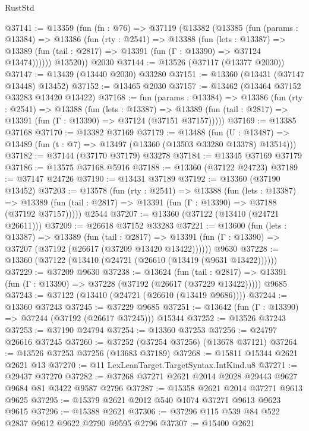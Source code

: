 \begin{lexlean}{RustStd}
\begin{coremodule}
@37141 := @13359
    (fun (fn : @76) =>
    @37119
      (@13382
        (@13385
          (fun (params : @13384) =>
          @13386
            (fun (rty : @2541) =>
            @13388
              (fun (lets : @13387) =>
              @13389 (fun (tail : @2817) => @13391 (fun (Γ : @13390) => @37124 @13474))))))
        @13520))
    @2030
@37144 := @13526 (@37117 (@13377 @2030))
@37147 := @13439 (@13440 @2030) @33280
@37151 := @13360 (@13431 (@37147 @13448) @13452)
@37152 := @13465 @2030
@37157 := @13462 (@13464 @37152 @33283 @13420 @13422)
@37168 := fun (params : @13384) =>
  @13386
    (fun (rty : @2541) =>
    @13388
      (fun (lets : @13387) =>
      @13389 (fun (tail : @2817) => @13391 (fun (Γ : @13390) => @37124 (@37151 @37157)))))
@37169 := @13385 @37168
@37170 := @13382 @37169
@37179 := @13488
    (fun (U : @13487) => @13489 (fun (t : @7) => @13497 (@13360 (@13503 @33280 @13378) @13514)))
@37182 := @37144 (@37170 @37179) @33278
@37184 := @13345 @37169 @37179
@37186 := @13575 @37168 @5916
@37188 := @13360 (@37122 @24723)
@37189 := @37147 @24726
@37190 := @13431 @37189
@37192 := @13360 (@37190 @13452)
@37203 := @13578
    (fun (rty : @2541) =>
    @13388
      (fun (lets : @13387) =>
      @13389 (fun (tail : @2817) => @13391 (fun (Γ : @13390) => @37188 (@37192 @37157)))))
    @2544
@37207 := @13360 (@37122 (@13410 (@24721 @26611)))
@37209 := @26618 @37152 @33283
@37221 := @13600
    (fun (lets : @13387) =>
    @13389
      (fun (tail : @2817) =>
      @13391 (fun (Γ : @13390) => @37207 (@37192 (@26617 (@37209 @13420 @13422))))))
    @9630
@37228 := @13360 (@37122 (@13410 (@24721 (@26610 (@13419 (@9631 @13422))))))
@37229 := @37209 @9630
@37238 := @13624
    (fun (tail : @2817) => @13391 (fun (Γ : @13390) => @37228 (@37192 (@26617 (@37229 @13422)))))
    @9685
@37243 := @37122 (@13410 (@24721 (@26610 (@13419 @9686))))
@37244 := @13360 @37243
@37245 := @37229 @9685
@37251 := @13642 (fun (Γ : @13390) => @37244 (@37192 (@26617 @37245))) @15344
@37252 := @13526 @37243
@37253 := @37190 @24794
@37254 := @13360 @37253
@37256 := @24797 @26616 @37245
@37260 := @37252 (@37254 @37256) (@13678 @37121)
@37264 := @13526 @37253 @37256 (@13683 @37189)
@37268 := @15811 @15344 @2621 @2621 @13
@37270 := @11 LexLeanTarget.TargetSyntax.IntKind.u8
@37271 := @29437 @37270
@37282 := @37268 @37271 @2621 @2014 @2028 @29443 @9627 @9684 @81 @3422 @9587 @2796
@37287 := @15358 @2621 @2014 @37271 @9613 @9625
@37295 := @15379 @2621 @2012 @540 @1074 @37271 @9613 @9623 @9615
@37296 := @15388 @2621
@37306 := @37296 @115 @539 @84 @522 @2837 @9612 @9622 @2790 @9595 @2796
@37307 := @15400 @2621

\end{coremodule}
\end{lexlean}
